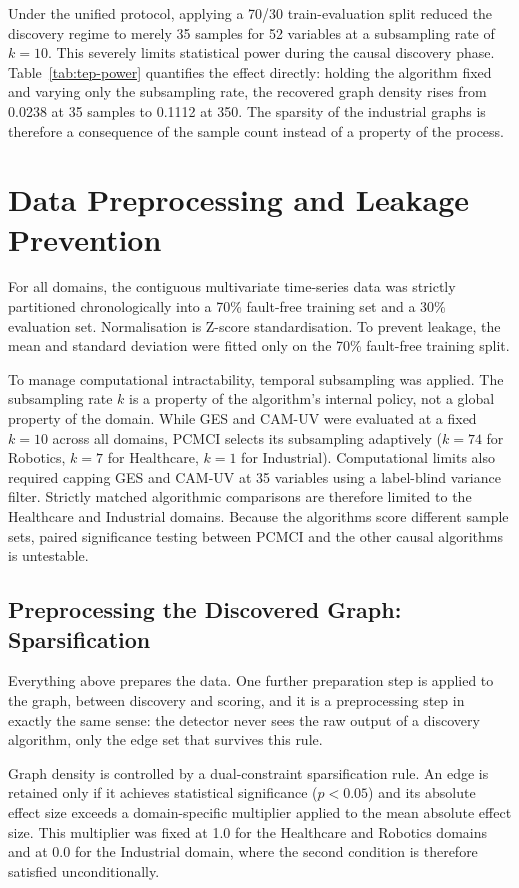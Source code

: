 Under the unified protocol, applying a 70/30 train-evaluation split reduced the discovery regime to merely 35 samples for 52 variables at a subsampling rate of $k=10$. This severely limits statistical power during the causal discovery phase. Table~\ref{tab:tep-power} quantifies the effect directly: holding the algorithm fixed and varying only the subsampling rate, the recovered graph density rises from 0.0238 at 35 samples to 0.1112 at 350. The sparsity of the industrial graphs is therefore a consequence of the sample count instead of a property of the process.



\section{Data Preprocessing and Leakage Prevention}
For all domains, the contiguous multivariate time-series data was strictly partitioned chronologically into a 70\% fault-free training set and a 30\% evaluation set. Normalisation is Z-score standardisation. To prevent leakage, the mean and standard deviation were fitted only on the 70\% fault-free training split.

To manage computational intractability, temporal subsampling was applied. The subsampling rate $k$ is a property of the algorithm's internal policy, not a global property of the domain. While GES and CAM-UV were evaluated at a fixed $k=10$ across all domains, PCMCI selects its subsampling adaptively ($k=74$ for Robotics, $k=7$ for Healthcare, $k=1$ for Industrial). Computational limits also required capping GES and CAM-UV at 35 variables using a label-blind variance filter. Strictly matched algorithmic comparisons are therefore limited to the Healthcare and Industrial domains. Because the algorithms score different sample sets, paired significance testing between PCMCI and the other causal algorithms is untestable.

\subsection{Preprocessing the Discovered Graph: Sparsification}
Everything above prepares the data. One further preparation step is applied to the graph, between discovery and scoring, and it is a preprocessing step in exactly the same sense: the detector never sees the raw output of a discovery algorithm, only the edge set that survives this rule.

Graph density is controlled by a dual-constraint sparsification rule. An edge is retained only if it achieves statistical significance ($p < 0.05$) and its absolute effect size exceeds a domain-specific multiplier applied to the mean absolute effect size. This multiplier was fixed at 1.0 for the Healthcare and Robotics domains and at 0.0 for the Industrial domain, where the second condition is therefore satisfied unconditionally.

